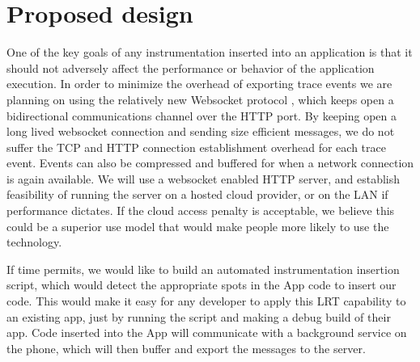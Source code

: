 \documentclass[11pt]{article}
\begin{document}
\section{Proposed design}
One of the key goals of any instrumentation inserted into an application is 
that it should not adversely affect the performance or behavior of the 
application execution. In order to minimize the overhead of exporting trace 
events we are planning on using the relatively new Websocket protocol 
\cite{WebsocketRFC} , which keeps open a bidirectional communications channel 
over the HTTP port.  By keeping open a long lived 
websocket connection and sending size efficient 
messages, we do not suffer the TCP and HTTP connection establishment overhead 
for each trace event. Events can also be compressed and buffered for when a 
network connection is again available.  We will use a websocket enabled HTTP 
server, and establish feasibility of running the server on a hosted cloud 
provider, or on the LAN if performance dictates. If the cloud access penalty is 
acceptable, we believe this could be a superior use model that would make people
more likely to use the technology.

If time permits, we would like to build an automated instrumentation insertion 
script, which would detect the appropriate spots in the App code to insert our 
code. This would make it easy for any developer to apply this  LRT capability to
an existing app, just by running the script and making a debug build of their 
app. Code inserted into the App will communicate with a background service on 
the phone, which will then buffer and export the messages to the server.




{}

\end{document}
